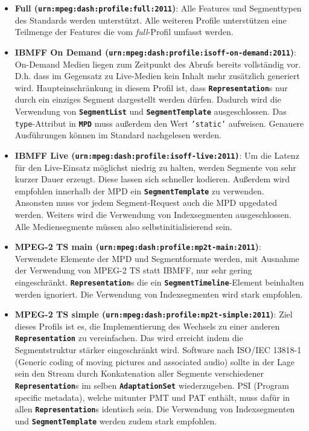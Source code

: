 \documentclass[paper = a4, fontsize = 12pt, parskip = half]{scrartcl} %
\def\attr#1{\texttt{#1}}
\def\elem#1{\texttt{\textbf{#1}}}
\begin{document}
\begin{itemize}
	\item \textbf{Full (\attr{urn:mpeg:dash:profile:full:2011})}: Alle Features und Segmenttypen des Standards werden unterstützt. Alle weiteren Profile unterstützen eine Teilmenge der Features die vom \textit{full}-Profil umfasst werden.
	\item \textbf{IBMFF On Demand (\attr{urn:mpeg:dash:profile:isoff-on-demand:2011})}: On-Demand Medien liegen zum Zeitpunkt des Abrufs bereits vollständig vor. D.h. dass im Gegensatz zu Live-Medien kein Inhalt mehr zusätzlich generiert wird. Haupteinschränkung in diesem Profil ist, dass \elem{Representation}s nur durch ein einziges Segment dargestellt werden dürfen. Dadurch wird die Verwendung von \elem{SegmentList} und \elem{SegmentTemplate} ausgeschlossen. Das \attr{type}-Attribut in \elem{MPD} muss außerdem den Wert \attr{'static'} aufweisen. Genauere Ausführungen können im Standard nachgelesen werden.
	\item \textbf{IBMFF Live (\attr{urn:mpeg:dash:profile:isoff-live:2011)}}: Um die Latenz für den Live-Einsatz möglichst niedrig zu halten, werden Segmente von sehr kurzer Dauer erzeugt. Diese lassen sich schneller kodieren. Außerdem wird empfohlen innerhalb der MPD ein \elem{SegmentTemplate} zu verwenden. Ansonsten muss vor jedem Segment-Request auch die MPD upgedated werden. Weiters wird die Verwendung von Indexsegmenten ausgeschlossen. Alle Mediensegmente müssen also selbstinitialisierend sein.
	\item \textbf{MPEG-2 TS main (\attr{urn:mpeg:dash:profile:mp2t-main:2011})}: Verwendete Elemente der MPD und Segmentformate werden, mit Ausnahme der Verwendung von MPEG-2 TS statt IBMFF, nur sehr gering eingeschränkt. \elem{Representation}s die ein \elem{SegmentTimeline}-Element beinhalten werden ignoriert. Die Verwendung von Indexsegmenten wird stark empfohlen.
	\item \textbf{MPEG-2 TS simple (\attr{urn:mpeg:dash:profile:mp2t-simple:2011})}: Ziel dieses Profils ist es, die Implementierung des Wechsels zu einer anderen \elem{Representation} zu vereinfachen. Das wird erreicht indem die Segmentstruktur stärker eingeschränkt wird. Software nach ISO/IEC 13818-1 (Generic coding of moving pictures and associated audio) sollte in der Lage sein den Stream durch Konkatenation aller Segmente verschiedener \elem{Representation}s im selben \elem{AdaptationSet} wiederzugeben. PSI (Program specific metadata), welche mitunter PMT und PAT enthält, muss dafür in allen \elem{Representation}s identisch sein. Die Verwendung von Indexsegmenten und \elem{SegmentTemplate} werden zudem stark empfohlen.
\end{itemize}
 
\end{document}
